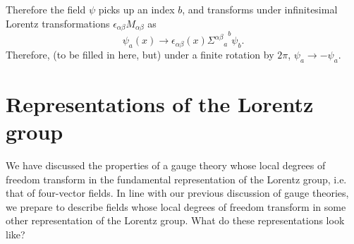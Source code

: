 \documentclass[main.tex]{subfiles}
\begin{document}
Therefore the field $\psi$ picks up an index $b$, and transforms under infinitesimal Lorentz transformations $\epsilon_{\alpha \beta} M_{\alpha \beta}$ as 
\[
\psi_a (x) \to \epsilon_{\alpha \beta} (x) {{\Sigma^{\alpha \beta}}_a}^b \psi_b.
\]
Therefore, (to be filled in here, but) under a finite rotation by $2\pi$, $\psi_a \to -\psi_a$.
\newpage
\section{Representations of the Lorentz group}
We have discussed the properties of a gauge theory whose local degrees of freedom transform in the fundamental representation of the Lorentz group, i.e. that of four-vector fields. In line with our previous discussion of gauge theories, we prepare to describe fields whose local degrees of freedom transform in some other representation of the Lorentz group. What do these representations look like?
\end{document}
